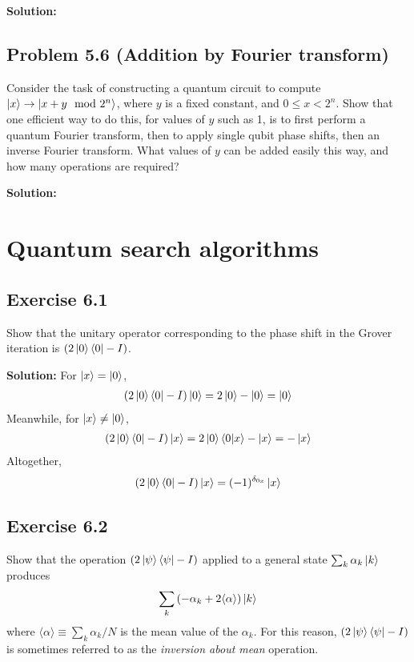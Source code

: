 \documentclass{book}
\begin{document}
    \textbf{Solution:}

\section*{Problem 5.6 (Addition by Fourier transform)}
    Consider the task of constructing a quantum circuit to compute $\ket{x}\rightarrow \ket{x +y \mod 2^n}$, where $y$ is a fixed constant, and $0\leq x < 2^n$. Show that one efficient way to do this, for values of $y$ such as 1, is to first perform a quantum Fourier transform, then to apply single qubit phase shifts, then an inverse Fourier transform. What values of $y$ can be added easily this way, and how many operations are required?
    
    \textbf{Solution:}

\chapter{Quantum search algorithms}

\section*{Exercise 6.1} 
    Show that the unitary operator corresponding to the phase shift in the Grover iteration is $(2\ket{0}\bra{0}-I)$.
    
    \textbf{Solution:} For $\ket{x} = \ket{0}$,
    \begin{align}
        (2\ket{0}\bra{0}-I)\ket{0} = 2\ket{0}-\ket{0} = \ket{0}
    \end{align}
    Meanwhile, for $\ket{x} \neq \ket{0}$,
    \begin{align}
        (2\ket{0}\bra{0}-I)\ket{x} = 2\ket{0}\braket{0}{x}-\ket{x} = -\ket{x}
    \end{align}
    Altogether,
    \begin{align}
        (2\ket{0}\bra{0}-I)\ket{x} = (-1)^{\delta_{0x}}\ket{x}
    \end{align}

\section*{Exercise 6.2}
    Show that the operation $(2\ket{\psi}\bra{\psi}-I)$ applied to a general state $\sum_k \alpha_k \ket{k}$ produces
    \begin{align}
        \sum_k \left(-\alpha_k+2\langle\alpha\rangle\right)\ket{k}
    \end{align}
    where $\langle\alpha\rangle \equiv \sum_k\alpha_k/N$ is the mean value of the $\alpha_k$. For this reason, $(2\ket{\psi}\bra{\psi}-I)$ is sometimes referred to as the \emph{inversion about mean} operation.
    
\end{document}
